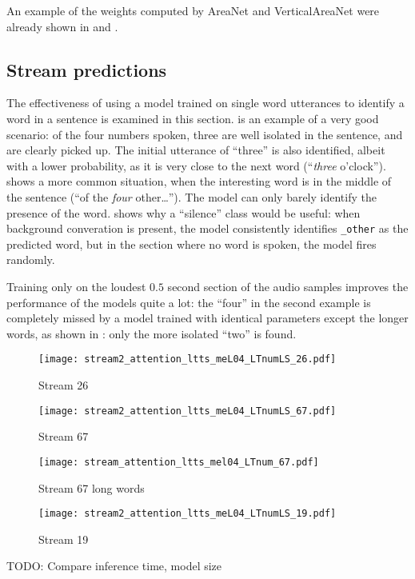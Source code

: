 An example of the weights computed by AreaNet and VerticalAreaNet were already shown 
in  and .

\subsection{Stream predictions}

The effectiveness of using a model trained on single word utterances to
identify a word in a sentence is examined in this section.
 is an example of a very good
scenario: of the four numbers spoken, three are well isolated in the sentence,
and are clearly picked up. The initial utterance of ``three'' is also
identified, albeit with a lower probability, as it is very close to the next
word (``\textit{three} o'clock'').
 shows a more common situation,
when the interesting word is in the middle of the sentence (``of the
\textit{four} other\ldots''). The model can only barely identify the presence
of the word.
 shows why a ``silence'' class
would be useful: when background converation is present, the model consistently
identifies \texttt{\_other} as the predicted word, but in the section where no
word is spoken, the model fires randomly.

Training only on the loudest $0.5$ second section of the audio samples improves
the performance of the models quite a lot: the ``four'' in the second example
is completely missed by a model trained with identical parameters except the
longer words, as shown in : only
the more isolated ``two'' is found.

\begin{figure}[h!]
    \centering
    \texttt{[image: stream2\_attention\_ltts\_meL04\_LTnumLS\_26.pdf]}
    \caption{Stream 26}%
    \label{fig:stream_attention_ltts_meL04_LTnumLS_26}
\end{figure}

\begin{figure}[h!]
    \centering
    \texttt{[image: stream2\_attention\_ltts\_meL04\_LTnumLS\_67.pdf]}
    \caption{Stream 67}%
    \label{fig:stream_attention_ltts_meL04_LTnumLS_67}
\end{figure}

\begin{figure}[h!]
    \centering
    \texttt{[image: stream\_attention\_ltts\_mel04\_LTnum\_67.pdf]}
    \caption{Stream 67 long words}%
    \label{fig:stream_attention_ltts_mel04_LTnum_67}
\end{figure}

\begin{figure}[h!]
    \centering
    \texttt{[image: stream2\_attention\_ltts\_meL04\_LTnumLS\_19.pdf]}
    \caption{Stream 19}%
    \label{fig:stream_attention_ltts_meL04_LTnumLS_19}
\end{figure}


TODO: Compare inference time, model size
